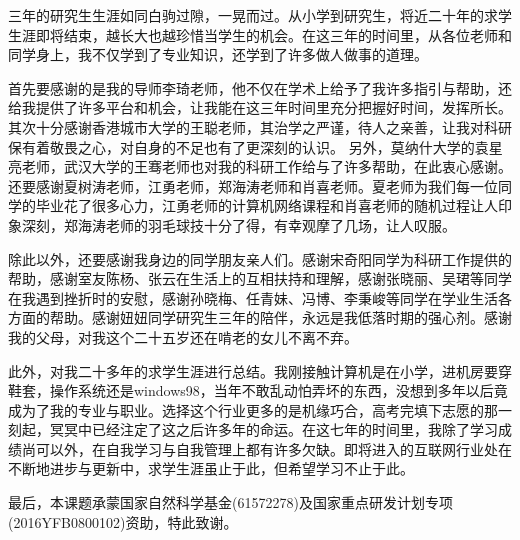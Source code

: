 \begin{acknowledgement}

  三年的研究生生涯如同白驹过隙，一晃而过。从小学到研究生，将近二十年的求学生涯即将结束，越长大也越珍惜当学生的机会。在这三年的时间里，从各位老师和同学身上，我不仅学到了专业知识，还学到了许多做人做事的道理。

  首先要感谢的是我的导师李琦老师，他不仅在学术上给予了我许多指引与帮助，还给我提供了许多平台和机会，让我能在这三年时间里充分把握好时间，发挥所长。
  其次十分感谢香港城市大学的王聪老师，其治学之严谨，待人之亲善，让我对科研保有着敬畏之心，对自身的不足也有了更深刻的认识。
  另外，莫纳什大学的袁星亮老师，武汉大学的王骞老师也对我的科研工作给与了许多帮助，在此衷心感谢。
  还要感谢夏树涛老师，江勇老师，郑海涛老师和肖喜老师。夏老师为我们每一位同学的毕业花了很多心力，江勇老师的计算机网络课程和肖喜老师的随机过程让人印象深刻，郑海涛老师的羽毛球技十分了得，有幸观摩了几场，让人叹服。

  除此以外，还要感谢我身边的同学朋友亲人们。感谢宋奇阳同学为科研工作提供的帮助，感谢室友陈杨、张云在生活上的互相扶持和理解，感谢张晓丽、吴珺等同学在我遇到挫折时的安慰，感谢孙晓梅、任青妹、冯博、李秉峻等同学在学业生活各方面的帮助。感谢妞妞同学研究生三年的陪伴，永远是我低落时期的强心剂。感谢我的父母，对我这个二十五岁还在啃老的女儿不离不弃。

  此外，对我二十多年的求学生涯进行总结。我刚接触计算机是在小学，进机房要穿鞋套，操作系统还是windows98，当年不敢乱动怕弄坏的东西，没想到多年以后竟成为了我的专业与职业。选择这个行业更多的是机缘巧合，高考完填下志愿的那一刻起，冥冥中已经注定了这之后许多年的命运。在这七年的时间里，我除了学习成绩尚可以外，在自我学习与自我管理上都有许多欠缺。即将进入的互联网行业处在不断地进步与更新中，求学生涯虽止于此，但希望学习不止于此。

  最后，本课题承蒙国家自然科学基金(61572278)及国家重点研发计划专项(2016YFB0800102)资助，特此致谢。

\end{acknowledgement}
